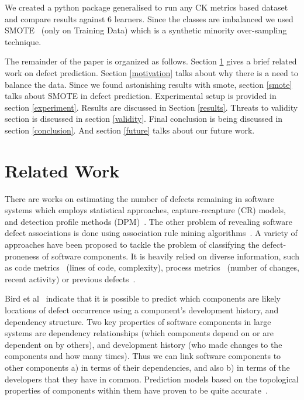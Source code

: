\documentclass[conference]{IEEEtran}
\begin{document}
We created a python package generalised to run any CK metrics based dataset and compare results against 6 learners. Since the classes are imbalanced we used SMOTE~\cite{chawla2002smote} (only on Training Data) which is a synthetic minority over-sampling technique.

The remainder of the paper is organized as follows. Section \ref{review} gives a brief related work on defect prediction. Section \ref{motivation} talks about why there is a need to balance the data. Since we found astonishing results with smote, section \ref{smote} talks about SMOTE in defect prediction. Experimental setup is provided in section \ref{experiment}. Results are discussed in Section \ref{results}. Threats to validity section is discussed in section \ref{validity}. Final conclusion is being discussed in section \ref{conclusion}. And section \ref{future} talks about our future work.

\section{Related Work}
\label{review}

There are works on estimating the number of defects remaining in software systems which employs statistical approaches, capture-recapture (CR) models, and detection profile methods (DPM)~\cite{song2011general}. The other problem of revealing software defect associations is done using association rule mining
algorithms~\cite{song2006software}. A variety of approaches have been proposed to tackle the problem of classifying the defect-proneness of software components. It is heavily relied on diverse information, such as code metrics~\cite{d2010extensive,menzies2007data, nagappan2006mining,shepperd2014researcher} (lines of code, complexity), process metrics~\cite{hassan2009predicting} (number of changes, recent activity) or previous defects~\cite{kim2007predicting}.

Bird et al~\cite{bird2009putting} indicate that it is possible to predict which components are likely locations of
defect occurrence using a component's development history,
and dependency structure. Two key properties of software components
in large systems are dependency relationships (which components
depend on or are dependent on by others), and development
history (who made changes to the components and
how many times). Thus we can link software components
to other components a) in terms of their dependencies, and
also b) in terms of the developers that they have in common. Prediction models based on the topological properties
of components within them have proven to be quite
accurate~\cite{zimmermann2008predicting}.
\end{document}

